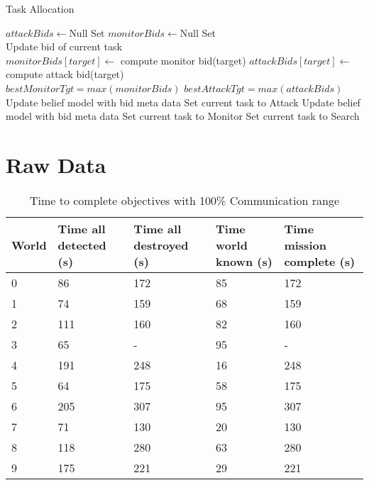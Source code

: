 \begin{algorithm}
	\caption{Task Allocation}
	\label{alg:taskAlloc}
	\begin{algorithmic}[1]
		\State $attackBids \gets $Null Set
		\State $monitorBids \gets $Null Set
		\\
			\State Update bid of current task
		\EndIf
		\\
			\State $monitorBids[target] \gets$ compute monitor bid(target)
				\State $attackBids[target] \gets$ compute attack bid(target)
			\EndIf
		\EndFor
		\\
		\State $bestMonitorTgt = max(monitorBids)$
		\State $bestAttackTgt = max(attackBids)$
		\\
			\State Update belief model with bid meta data
			\State Set current task to Attack
			\State Update belief model with bid meta data		
			\State Set current task to Monitor			
		\Else
			\State Set current task to Search
		\EndIf
		
	\end{algorithmic}
\end{algorithm}

\section{Raw Data}
\begin{table}[h]
	\caption{Time to complete objectives with 100\% Communication range}
	\centering
	\label{tab:comm100}
	
	\begin{tabular}{|p{1cm}|p{1.5cm}|p{1.75cm}|p{1.5cm}|p{1.5cm}|}
		\hline
		World & Time all detected (s) & Time all destroyed (s) & Time world known (s) & Time mission complete (s) \\
		\hline
		0&	 86 & \cellcolor{yellow}172 & 85 & 172 \\ \hline
		1&	 74 & \cellcolor{yellow}159 & 68 & 159 \\ \hline
		2&	111 & \cellcolor{yellow}160 & 82 & 160 \\ \hline
		3&	 65 & -                     & 95 &	-  \\ \hline
		4&	191 & \cellcolor{yellow}248 & 16 & 248 \\ \hline
		5&	 64 & \cellcolor{yellow}175 & 58 & 175 \\ \hline
		6&	205 & \cellcolor{yellow}307 & 95 & 307 \\ \hline
		7&	 71 & \cellcolor{yellow}130 & 20 & 130 \\ \hline
		8&	118 & \cellcolor{yellow}280 & 63 & 280 \\ \hline
		9&	175 & \cellcolor{yellow}221	& 29 & 221 \\ \hline
	\end{tabular}
\end{table}



